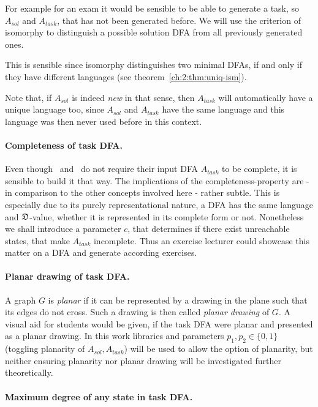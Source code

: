 For example for an exam it would be sensible to be able to generate a task, so $A_{sol}$ and $A_{task}$, that has not been generated before. We will use the criterion of isomorphy to distinguish a possible solution DFA from all previously generated ones.

This is sensible since isomorphy distinguishes two minimal DFAs, if and only if they have different languages (see theorem~\ref{ch:2:thm:uniq-ism}).

Note that, if $A_{sol}$ is indeed \emph{new} in that sense, then $A_{task}$ will automatically have a unique language too, since $A_{sol}$ and $A_{task}$ have the same language and this language was then never used before in this context.

\paragraph*{Completeness of task DFA.}

Even though \CompUnr\ and \RemUnr\ do not require their input DFA $A_{task}$ to be complete, it is sensible to build it that way. The implications of the completeness-property are - in comparison to the other concepts involved here - rather subtle. This is especially due to its purely representational nature, a DFA has the same language and $\mathfrak{D}$-value, whether it is represented in its complete form or not. Nonetheless we shall introduce a parameter $c$, that determines if there exist unreachable states, that make $A_{task}$ incomplete. Thus an exercise lecturer could showcase this matter on a DFA and generate according exercises.

\paragraph*{Planar drawing of task DFA.}

A graph $G$ is \emph{planar} if it can be represented by a drawing in the plane such that its edges do not cross. Such a drawing is then called \emph{planar drawing} of $G$. A visual aid for students would be given, if the task DFA were planar and presented as a planar drawing. In this work libraries and parameters $p_1, p_2 \in \{0,1\}$ (toggling planarity of $A_{sol}, A_{task}$) will be used to allow the option of planarity, but neither ensuring planarity nor planar drawing will be investigated further theoretically.

\paragraph*{Maximum degree of any state in task DFA.}

